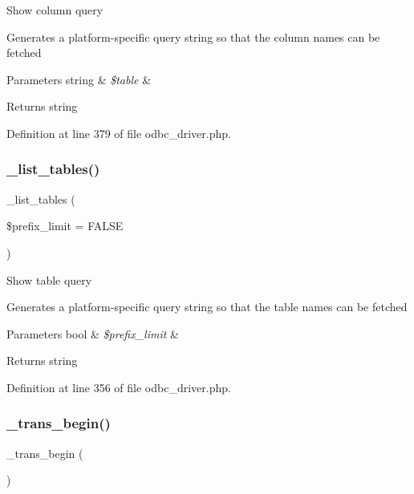 Show column query

Generates a platform-\/specific query string so that the column names can be fetched


\begin{DoxyParams}[1]{Parameters}
string & {\em \$table} & \\
\hline
\end{DoxyParams}
\begin{DoxyReturn}{Returns}
string 
\end{DoxyReturn}


Definition at line 379 of file odbc\+\_\+driver.\+php.

\mbox{\label{class_c_i___d_b__odbc__driver_a435c0f3ce54fe7daa178baa8532ebd54}} 
\subsubsection{\texorpdfstring{\_list\_tables()}{\_list\_tables()}}
{\footnotesize\ttfamily \+\_\+list\+\_\+tables (\begin{DoxyParamCaption}\item[{}]{\$prefix\+\_\+limit = {\ttfamily FALSE} }\end{DoxyParamCaption})\hspace{0.3cm}{\ttfamily [protected]}}

Show table query

Generates a platform-\/specific query string so that the table names can be fetched


\begin{DoxyParams}[1]{Parameters}
bool & {\em \$prefix\+\_\+limit} & \\
\hline
\end{DoxyParams}
\begin{DoxyReturn}{Returns}
string 
\end{DoxyReturn}


Definition at line 356 of file odbc\+\_\+driver.\+php.

\mbox{\label{class_c_i___d_b__odbc__driver_ac81ac882c1d54347d810199a15856aac}} 
\subsubsection{\texorpdfstring{\_trans\_begin()}{\_trans\_begin()}}
{\footnotesize\ttfamily \+\_\+trans\+\_\+begin (\begin{DoxyParamCaption}{ }\end{DoxyParamCaption})\hspace{0.3cm}{\ttfamily [protected]}}

